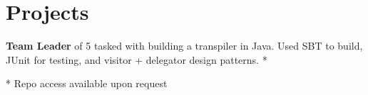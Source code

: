 \documentclass[]{hieudo-build}
\begin{document}
\begin{minipage}[t]{0.65\textwidth}
\section{Projects}
{\bf Team Leader} of 5 tasked with building a transpiler in Java. Used SBT to build, JUnit for testing, and visitor + delegator design patterns. *
\sectionsep



* Repo access available upon request
\end{minipage}

\end{document}
